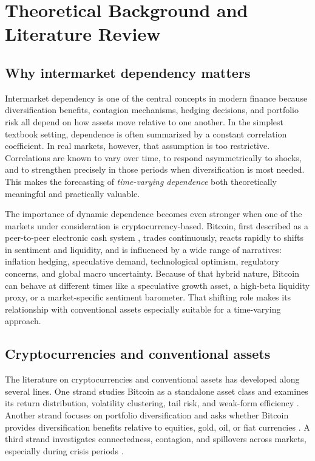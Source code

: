 ﻿\section{Theoretical Background and Literature Review}

\subsection{Why intermarket dependency matters}

Intermarket dependency is one of the central concepts in modern finance because diversification benefits, contagion mechanisms, hedging decisions, and portfolio risk all depend on how assets move relative to one another. In the simplest textbook setting, dependence is often summarized by a constant correlation coefficient. In real markets, however, that assumption is too restrictive. Correlations are known to vary over time, to respond asymmetrically to shocks, and to strengthen precisely in those periods when diversification is most needed. This makes the forecasting of \emph{time-varying dependence} both theoretically meaningful and practically valuable.

The importance of dynamic dependence becomes even stronger when one of the markets under consideration is cryptocurrency-based. Bitcoin, first described as a peer-to-peer electronic cash system \cite{nakamoto2008}, trades continuously, reacts rapidly to shifts in sentiment and liquidity, and is influenced by a wide range of narratives: inflation hedging, speculative demand, technological optimism, regulatory concerns, and global macro uncertainty. Because of that hybrid nature, Bitcoin can behave at different times like a speculative growth asset, a high-beta liquidity proxy, or a market-specific sentiment barometer. That shifting role makes its relationship with conventional assets especially suitable for a time-varying approach.

\subsection{Cryptocurrencies and conventional assets}

The literature on cryptocurrencies and conventional assets has developed along several lines. One strand studies Bitcoin as a standalone asset class and examines its return distribution, volatility clustering, tail risk, and weak-form efficiency \cite{nakamoto2008, katsiampa2017, baur2018}. Another strand focuses on portfolio diversification and asks whether Bitcoin provides diversification benefits relative to equities, gold, oil, or fiat currencies \cite{bouri2017, dyhrberg2016, baur2010}. A third strand investigates connectedness, contagion, and spillovers across markets, especially during crisis periods \cite{corbet2018, forbes2002}.

